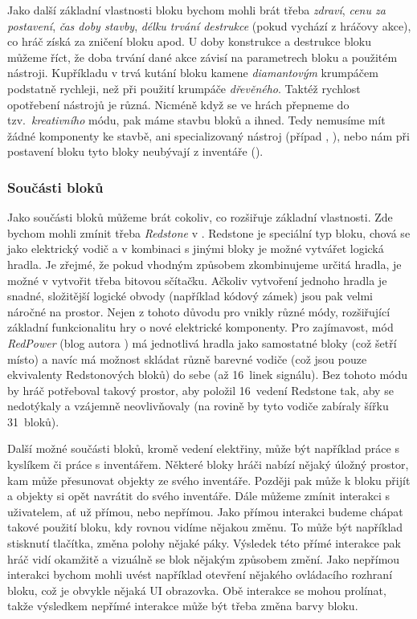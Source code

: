 Jako další základní vlastnosti bloku bychom mohli brát třeba \textit{zdraví}, \textit{cenu za postavení}, \textit{čas doby stavby}, \textit{délku trvání destrukce} (pokud vychází z hráčovy akce), co hráč získá za zničení bloku apod. U doby konstrukce a destrukce bloku můžeme říct, že doba trvání dané akce závisí na parametrech bloku a použitém nástroji. Kupříkladu v  trvá kutání bloku kamene \textit{diamantovým} krumpáčem podstatně rychleji, než při použití krumpáče \textit{dřevěného}. Taktéž rychlost opotřebení nástrojů je různá. Nicméně když se ve hrách přepneme do tzv.~\textit{kreativního} módu, pak máme stavbu bloků  a ihned. Tedy nemusíme mít žádné komponenty ke stavbě, ani specializovaný nástroj (případ \SE{}, \ME{}), nebo nám při postavení bloku tyto bloky neubývají z inventáře (\MC{}). 

\subsubsection{Součásti bloků}
Jako součásti bloků můžeme brát cokoliv, co rozšiřuje základní vlastnosti. Zde bychom mohli zmínit třeba \textit{Redstone} v . Redstone je speciální typ bloku, chová se jako elektrický vodič a v kombinaci s jinými bloky je možné vytvářet logická hradla. Je zřejmé, že pokud vhodným způsobem zkombinujeme určitá hradla, je možné v  vytvořit třeba bitovou sčítačku. Ačkoliv vytvoření jednoho hradla je snadné, složitější logické obvody (například kódový zámek) jsou pak velmi náročné na prostor. Nejen z tohoto důvodu pro \MC{} vnikly různé módy, rozšiřující základní funkcionalitu hry o nové elektrické komponenty. Pro zajímavost, mód \textit{RedPower} (blog autora \citep{eloraam}) má jednotlivá hradla jako samostatné bloky (což šetří místo) a navíc má možnost skládat různě barevné vodiče (což jsou pouze ekvivalenty Redstonových bloků) do sebe (až 16~linek signálu). Bez tohoto módu by hráč potřeboval takový prostor, aby položil 16~vedení Redstone tak, aby se nedotýkaly a vzájemně neovlivňovaly (na rovině by tyto vodiče zabíraly šířku 31~bloků). 

Další možné součásti bloků, kromě vedení elektřiny, může být například práce s kyslíkem či práce s inventářem. Některé bloky hráči nabízí nějaký úložný prostor, kam může přesunovat objekty ze svého inventáře. Později pak může k bloku přijít a objekty si opět navrátit do svého inventáře. 
Dále můžeme zmínit interakci s uživatelem, ať už přímou, nebo nepřímou. Jako přímou interakci budeme chápat takové použití bloku, kdy rovnou vidíme nějakou změnu. To může být například stisknutí tlačítka, změna polohy nějaké páky. Výsledek této přímé interakce pak hráč vidí okamžitě a vizuálně se blok nějakým způsobem změní. Jako nepřímou interakci bychom mohli uvést například otevření nějakého ovládacího rozhraní bloku, což je obvykle nějaká UI obrazovka. Obě interakce se mohou prolínat, takže výsledkem nepřímé interakce může být třeba změna barvy bloku.


